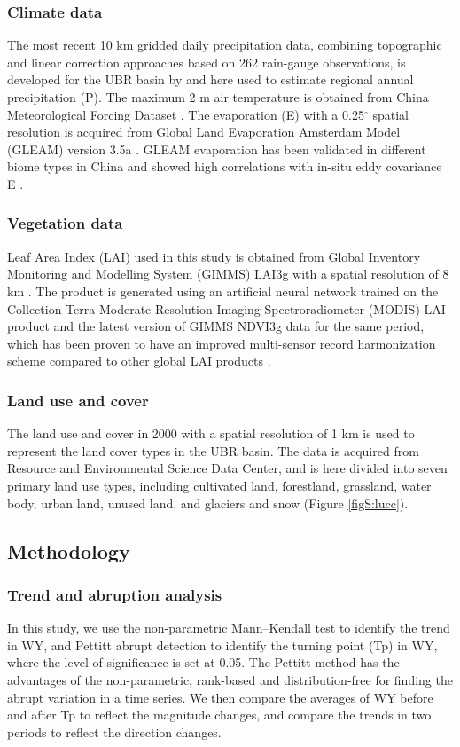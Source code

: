 \documentclass[hess, manuscript]{copernicus}
\begin{document}
\subsubsection{Climate data}
The most recent 10 km gridded daily precipitation data, combining topographic and linear correction approaches based on 262 rain-gauge observations, is developed for the UBR basin by \citet{sun2020precipitation} and here used to estimate regional annual precipitation (P). The maximum 2 m air temperature is obtained from China Meteorological Forcing Dataset \citep{he2020first}. The evaporation (E) with a 0.25$^{\circ}$ spatial resolution is acquired from Global Land Evaporation Amsterdam Model (GLEAM) version 3.5a \citep{martens2017gleam}. GLEAM evaporation has been validated in different biome types in China and showed high correlations with in-situ eddy covariance E \citep{yang2017multi}.

\subsubsection{Vegetation data}
Leaf Area Index (LAI) used in this study is obtained from Global Inventory Monitoring and Modelling System (GIMMS) LAI3g with a spatial resolution of 8 km \citep{zhu2013global}. The product is generated using an artificial neural network trained on the Collection Terra Moderate Resolution Imaging Spectroradiometer (MODIS) LAI product and the latest version of GIMMS NDVI3g data for the same period, which has been proven to have an improved multi-sensor record harmonization scheme compared to other global LAI products \citep{forzieri2020increased,gonsamo2021greening,zhu2016greening}. 

\subsubsection{Land use and cover}
The land use and cover in 2000 with a spatial resolution of 1 km is used to represent the land cover types in the UBR basin. The data is acquired from Resource and Environmental Science Data Center, and is here divided into seven primary land use types, including cultivated land, forestland, grassland, water body, urban land, unused land, and glaciers and snow (Figure \ref{figS:lucc}).

\subsection{Methodology}
\subsubsection{Trend and abruption analysis}
In this study, we use the non-parametric Mann--Kendall test \citep{kendall1938new,mann1945nonparametric} to identify the trend in WY, and Pettitt abrupt detection \citep{pettitt1979non} to identify the turning point (Tp) in WY, where the level of significance is set at 0.05. The Pettitt method has the advantages of the non-parametric, rank-based and distribution-free for finding the abrupt variation in a time series. We then compare the averages of WY before and after Tp to reflect the magnitude changes, and compare the trends in two periods to reflect the direction changes.
\end{document}
